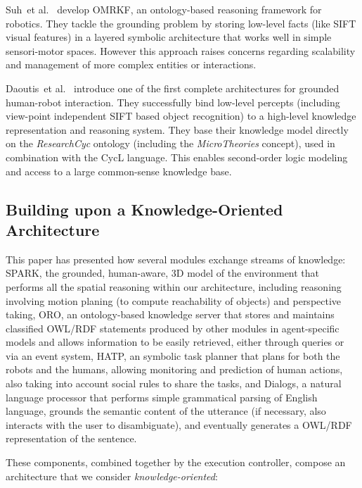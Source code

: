 \documentclass{svmult}
\newcommand{\etal}{et al.\xspace}
\begin{document}
Suh~\etal~\cite{Suh2007} develop {\sc OMRKF}, an ontology-based reasoning
framework for robotics. They tackle the grounding problem by storing low-level
facts (like SIFT visual features) in a layered symbolic architecture that works
well in simple sensori-motor spaces. However this approach raises concerns
regarding scalability and management of more complex entities or interactions.

Daoutis~\etal~\cite{Daoutis2009} introduce one of the first complete
architectures for grounded human-robot interaction. They successfully bind
low-level percepts (including view-point independent SIFT based object
recognition) to a high-level knowledge representation and reasoning system.
They base their knowledge model directly on the \textit{ResearchCyc} ontology
(including the \textit{MicroTheories} concept), used in combination with the
{\sc CycL} language. This enables second-order logic modeling and access to a
large common-sense knowledge base.


\subsection{Building upon a Knowledge-Oriented Architecture}

This paper has presented how several modules exchange streams of knowledge:
{\sc SPARK}, the grounded, human-aware, 3D model of the environment that
performs all the spatial reasoning within our architecture, including reasoning
involving motion planing (to compute reachability of objects) and perspective
taking, {\sc ORO}, an ontology-based knowledge server that stores and maintains
classified OWL/RDF statements produced by other modules in agent-specific
models and allows information to be easily retrieved, either through queries or
via an event system, {\sc HATP}, an symbolic task planner that plans for both
the robots and the humans, allowing monitoring and prediction of human actions,
also taking into account social rules to share the tasks, and  {\sc Dialogs}, a
natural language processor that performs simple grammatical parsing of English
language, grounds the semantic content of the utterance (if necessary, also
interacts with the user to disambiguate), and eventually generates a OWL/RDF
representation of the sentence.

These components, combined together by the execution controller, compose
an architecture that we consider \emph{knowledge-oriented}:
\end{document}
